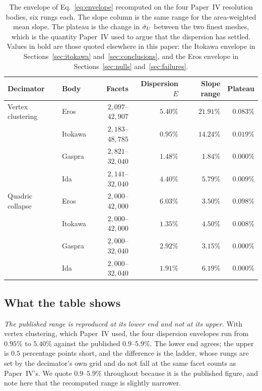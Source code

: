 \begin{table}[htbp]
\centering
\small
\setlength{\tabcolsep}{5pt}
\caption{The envelope of Eq.~\eqref{eq:envelope} recomputed on the four
Paper~IV resolution bodies, six rungs each. The slope column is the same
range for the area-weighted mean slope. The plateau is the change in
$\tilde{\sigma}_{U}$ between the two finest meshes, which is the quantity Paper~IV used
to argue that the dispersion has settled. Values in bold are those quoted
elsewhere in this paper: the Itokawa envelope in
Sections~\ref{sec:itokawa} and~\ref{sec:conclusions}, and the Eros envelope
in Sections~\ref{sec:nulls} and~\ref{sec:failures}.}
\label{tab:envelope}
\begin{tabular}{llrrrr}
\toprule
Decimator & Body & Facets & Dispersion $E$ & Slope range & Plateau \\
\midrule
Vertex clustering & Eros    & $2{,}097$--$42{,}907$ & $5.40\%$ & $21.91\%$ & $0.083\%$ \\
                  & Itokawa & $2{,}183$--$48{,}785$ & $0.95\%$ & $14.24\%$ & $0.019\%$ \\
                  & Gaspra  & $2{,}821$--$32{,}040$ & $1.48\%$ & $1.84\%$  & $0.000\%$ \\
                  & Ida     & $2{,}141$--$32{,}040$ & $4.40\%$ & $5.79\%$  & $0.009\%$ \\
\addlinespace
Quadric collapse  & Eros    & $2{,}000$--$42{,}000$ & $\mathbf{6.03\%}$ & $3.50\%$ & $0.098\%$ \\
                  & Itokawa & $2{,}000$--$42{,}000$ & $\mathbf{1.35\%}$ & $4.50\%$ & $0.008\%$ \\
                  & Gaspra  & $2{,}000$--$32{,}040$ & $2.92\%$ & $3.15\%$  & $0.000\%$ \\
                  & Ida     & $2{,}000$--$32{,}040$ & $1.91\%$ & $6.19\%$  & $0.000\%$ \\
\bottomrule
\end{tabular}
\end{table}

\subsection{What the table shows}
\label{app:envelope:reading}

\emph{The published range is reproduced at its lower end and not at its
upper.} With vertex clustering, which Paper~IV used, the four dispersion
envelopes run from $0.95\%$ to $5.40\%$ against the published
$0.9$--$5.9\%$. The lower end agrees; the upper is $0.5$ percentage points
short, and the difference is the ladder, whose rungs are set by the
decimator's own grid and do not fall at the same facet counts as Paper~IV's.
We quote $0.9$--$5.9\%$ throughout because it is the published figure, and
note here that the recomputed range is slightly narrower.

